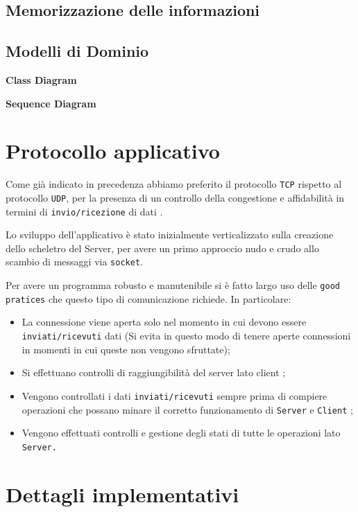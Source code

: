 \documentclass[letterpaper, 11pt]{article}
\begin{document}
\subsection{Memorizzazione delle informazioni}
\label{Guida al Client - Memorizzazione delle informazioni}
\subsection{Modelli di Dominio}
\label{Guida al Client - Modelli di Dominio}
\begin{center}
\textbf{Class Diagram}
\end{center}

\begin{center}
\textbf{Sequence Diagram}
\end{center}
\section{Protocollo applicativo}
\label{Protocollo applicativo}
Come già indicato in precedenza abbiamo preferito il protocollo \texttt{TCP} rispetto al protocollo \texttt{UDP}, per la presenza di un controllo della congestione e affidabilità in termini di \texttt{invio/ricezione} di dati \autocite{UDP}.

Lo sviluppo dell'applicativo è stato inizialmente verticalizzato sulla creazione dello scheletro del Server, per avere un primo approccio nudo e crudo allo scambio di messaggi via \texttt{socket}.

Per avere un programma robusto e manutenibile si è fatto largo uso delle \texttt{good pratices} che questo tipo di comunicazione richiede. In particolare:
\begin{itemize}
\item La connessione viene aperta solo nel momento in cui devono essere \texttt{inviati/ricevuti} dati (Si evita in questo modo di tenere aperte connessioni in momenti in cui queste non vengono sfruttate);
\item Si effettuano controlli di raggiungibilità del server lato client \autocite{RAGGIUNGIBILE};
\item Vengono controllati i dati \texttt{inviati/ricevuti} sempre prima di compiere operazioni che possano minare il corretto funzionamento di \texttt{Server} e \texttt{Client} \autocite{CONTROLLO};
\item Vengono effettuati controlli e gestione degli stati di tutte le operazioni lato \texttt{Server.}
\end{itemize}
\section{Dettagli implementativi}
\label{Dettagli implementativi}
\end{document}
